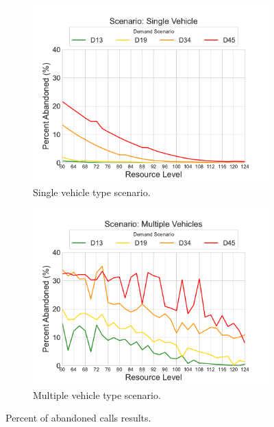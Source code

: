 \documentclass[preprint,12pt]{elsarticle}
\begin{document}
\begin{figure}
\begin{center}
\begin{subfigure}{0.42\textwidth}
\includegraphics[width=\textwidth]{img/plots/single_PercentAbandoned}
\caption{Single vehicle type scenario.}
\label{fig:results_abandoned_single}
\end{subfigure}
\begin{subfigure}{0.42\textwidth}
\includegraphics[width=\textwidth]{img/plots/multiple_PercentAbandoned}
\caption{Multiple vehicle type scenario.}
\label{fig:results_abandoned_multiple}
\end{subfigure} 
\end{center}
\caption{Percent of abandoned calls results.}
\end{figure}
\end{document}
